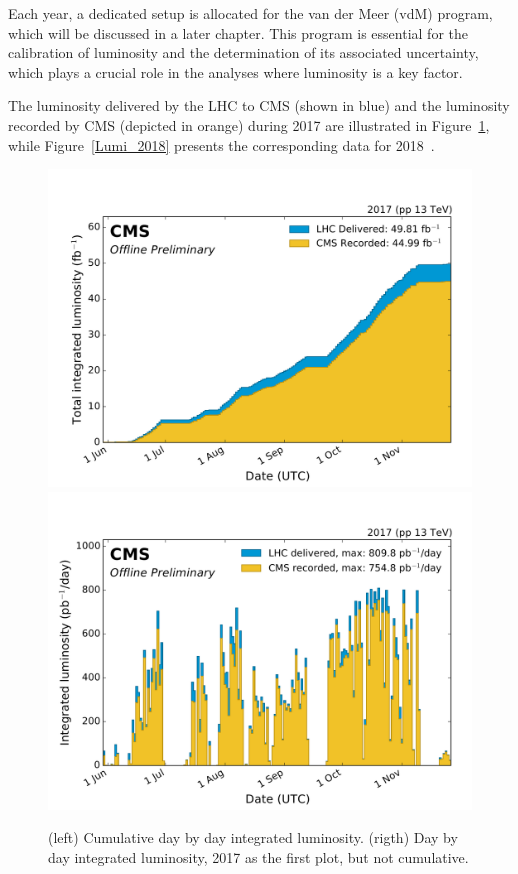 Each year, a dedicated setup is allocated for the van der Meer (vdM) program, which will be discussed in a later chapter. This program is essential for the calibration of luminosity and the determination of its associated uncertainty, which plays a crucial role in the analyses where luminosity is a key factor.  

The luminosity delivered by the LHC to CMS (shown in blue) and the luminosity recorded by CMS (depicted in orange) during 2017 are illustrated in Figure~\ref{Lumi_2017}, while Figure~\ref{Lumi_2018} presents the corresponding data for 2018~\citep{wikicern}.



\begin{center}
  \begin{figure}[h!]
    \centering
    \includegraphics[width=.45\textwidth]{Chapter3/Luminosity/int_lumi_per_day_cumulative_pp_2017_Normtag.pdf}
    \includegraphics[width=.45\textwidth]{Chapter3/Luminosity/int_lumi_per_day_pp_2017_Normtag.pdf}
    \caption[Cumulative day-by-day integrated luminosity in 2017]{(left) Cumulative day by day integrated luminosity. (rigth) Day by day integrated luminosity, 2017 as the first plot, but not cumulative.} 
    \label{Lumi_2017}
  \end{figure}
\end{center}




